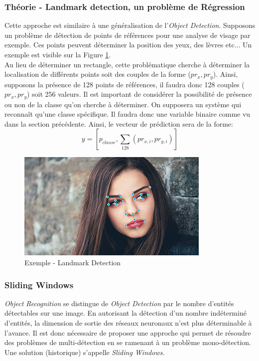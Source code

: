 \subsubsection{Théorie - Landmark detection, un problème de Régression}
Cette approche est similaire à une généralisation de l'\textit{Object Detection}. Supposons un problème de détection de points de références pour une analyse de visage par exemple. Ces points peuvent déterminer la position des yeux, des lèvres etc... Un exemple est visible sur la Figure \ref{landmarkdec}.\\

\noindent Au lieu de déterminer un rectangle, cette problématique cherche à déterminer la localisation de différents points soit des couples de la forme ($pr_x,pr_y$). Ainsi, supposons la présence de 128 points de références, il faudra donc 128 couples ($pr_x,pr_y$) soit 256 valeurs. Il est important de considérer la possibilité de présence ou non de la classe qu'on cherche à déterminer. On supposera un système qui reconnaît qu'une classe spécifique. Il faudra donc une variable binaire comme vu dans la section précédente. Ainsi, le vecteur de prédiction sera de la forme:
$$y=[p_{classe}, \sum_{128} (pr_{x,i},pr_{y,i})]$$

\begin{figure}
    \centering
    \includegraphics[scale=1.3]{./tex/computer-vision/object-recognition/landmark.jpg}
    \caption{Exemple - Landmark Detection}
    \label{landmarkdec}
\end{figure}

\subsubsection{Sliding Windows}
\textit{Object Recognition} se distingue de \textit{Object Detection} par le nombre d'entités détectables sur une image. En autorisant la détection d'un nombre indéterminé d'entités, la dimension de sortie des réseaux neuronaux n'est plus déterminable à l'avance. Il est donc nécessaire de proposer une approche qui permet de résoudre des problèmes de multi-détection en se ramenant à un problème mono-détection. Une solution (historique) s'appelle \textit{Sliding Windows}.\\

